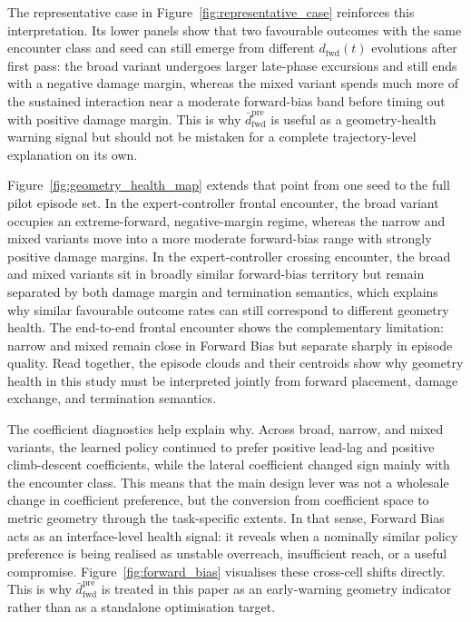 \documentclass[drones,article,submit,pdftex,moreauthors]{Definitions/mdpi}
\begin{document}
The representative case in Figure~\ref{fig:representative_case} reinforces this interpretation. Its lower panels show that two favourable outcomes with the same encounter class and seed can still emerge from different $d_{\mathrm{fwd}}(t)$ evolutions after first pass: the broad variant undergoes larger late-phase excursions and still ends with a negative damage margin, whereas the mixed variant spends much more of the sustained interaction near a moderate forward-bias band before timing out with positive damage margin. This is why $\bar{d}_{\mathrm{fwd}}^{\mathrm{pre}}$ is useful as a geometry-health warning signal but should not be mistaken for a complete trajectory-level explanation on its own.

Figure~\ref{fig:geometry_health_map} extends that point from one seed to the full pilot episode set. In the expert-controller frontal encounter, the broad variant occupies an extreme-forward, negative-margin regime, whereas the narrow and mixed variants move into a more moderate forward-bias range with strongly positive damage margins. In the expert-controller crossing encounter, the broad and mixed variants sit in broadly similar forward-bias territory but remain separated by both damage margin and termination semantics, which explains why similar favourable outcome rates can still correspond to different geometry health. The end-to-end frontal encounter shows the complementary limitation: narrow and mixed remain close in Forward Bias but separate sharply in episode quality. Read together, the episode clouds and their centroids show why geometry health in this study must be interpreted jointly from forward placement, damage exchange, and termination semantics.

The coefficient diagnostics help explain why. Across broad, narrow, and mixed variants, the learned policy continued to prefer positive lead-lag and positive climb-descent coefficients, while the lateral coefficient changed sign mainly with the encounter class. This means that the main design lever was not a wholesale change in coefficient preference, but the conversion from coefficient space to metric geometry through the task-specific extents. In that sense, Forward Bias acts as an interface-level health signal: it reveals when a nominally similar policy preference is being realised as unstable overreach, insufficient reach, or a useful compromise. Figure~\ref{fig:forward_bias} visualises these cross-cell shifts directly. This is why $\bar{d}_{\mathrm{fwd}}^{\mathrm{pre}}$ is treated in this paper as an early-warning geometry indicator rather than as a standalone optimisation target.
\end{document}

